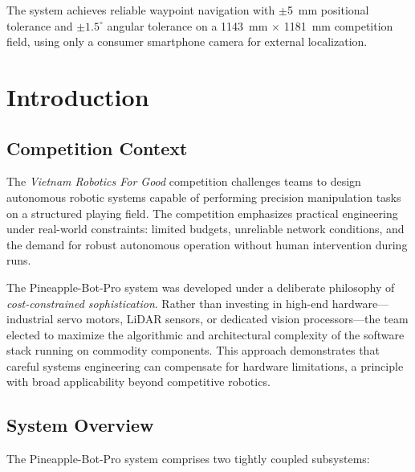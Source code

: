 \documentclass[12pt, a4paper, twoside]{article}
\begin{document}
The system achieves reliable waypoint navigation with $\pm$\SI{5}{\milli\metre} positional tolerance and $\pm 1.5^\circ$ angular tolerance on a \SI{1143}{\milli\metre} $\times$ \SI{1181}{\milli\metre} competition field, using only a consumer smartphone camera for external localization.

\section{Introduction}
\label{sec:introduction}

\subsection{Competition Context}

The \emph{Vietnam Robotics For Good} competition challenges teams to design autonomous robotic systems capable of performing precision manipulation tasks on a structured playing field. The competition emphasizes practical engineering under real-world constraints: limited budgets, unreliable network conditions, and the demand for robust autonomous operation without human intervention during runs.

The Pineapple-Bot-Pro system was developed under a deliberate philosophy of \emph{cost-constrained sophistication}. Rather than investing in high-end hardware---industrial servo motors, LiDAR sensors, or dedicated vision processors---the team elected to maximize the algorithmic and architectural complexity of the software stack running on commodity components. This approach demonstrates that careful systems engineering can compensate for hardware limitations, a principle with broad applicability beyond competitive robotics.

\subsection{System Overview}

The Pineapple-Bot-Pro system comprises two tightly coupled subsystems:
\end{document}

